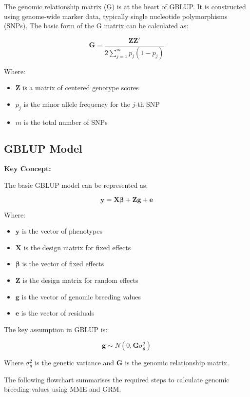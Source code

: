 \documentclass[12pt,a4paper]{article}
\newenvironment{keyconceptbox}[1][]
{\begin{basebox}[linecolor=uqblue]
\textbf{\color{uqblue}Key Concept:} \textit{#1}\par\noindent\ignorespaces}
{\end{basebox}}
\begin{document}
The genomic relationship matrix (G) is at the heart of GBLUP. It is constructed using genome-wide marker data, typically single nucleotide polymorphisms (SNPs). The basic form of the G matrix can be calculated as:

\[
\mathbf{G} = \frac{\mathbf{ZZ'}}{2\sum_{j=1}^m p_j(1-p_j)}
\]

Where:
\begin{itemize}
    \item $\mathbf{Z}$ is a matrix of centered genotype scores
    \item $p_j$ is the minor allele frequency for the $j$-th SNP
    \item $m$ is the total number of SNPs
\end{itemize}

\subsection{GBLUP Model}

\begin{keyconceptbox}
The basic GBLUP model can be represented as:

\[
\mathbf{y} = \mathbf{X\beta} + \mathbf{Zg} + \mathbf{e}
\]

Where:
\begin{itemize}
    \item $\mathbf{y}$ is the vector of phenotypes
    \item $\mathbf{X}$ is the design matrix for fixed effects
    \item $\mathbf{\beta}$ is the vector of fixed effects
    \item $\mathbf{Z}$ is the design matrix for random effects
    \item $\mathbf{g}$ is the vector of genomic breeding values
    \item $\mathbf{e}$ is the vector of residuals
\end{itemize}

The key assumption in GBLUP is:

\[
\mathbf{g} \sim N(0, \mathbf{G}\sigma_g^2)
\]

Where $\sigma_g^2$ is the genetic variance and $\mathbf{G}$ is the genomic relationship matrix.
\end{keyconceptbox}
The following flowchart summarises the required steps to calculate genomic breeding values using MME and GRM.\\
\end{document}
